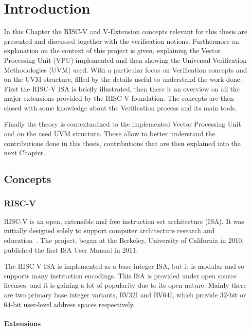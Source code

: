 \chapter{Introduction}
In this Chapter the RISC-V and V-Extension concepts relevant for this thesis are presented and discussed together with  the verification notions.
Furthermore an explanation on the context of this project is given,  explaining the Vector Processing Unit (VPU) implemented and then showing the Universal Verification Methodologies (UVM) used.
With a particular focus on Verification concepts and on the UVM structure, filled by the details useful to understand the work done.
First the RISC-V ISA is briefly illustrated, then there is an overview on all the major extensions provided by the RISC-V foundation. The concepts are then closed with some knowledge about the Verification process and its main tools. 

Finally the theory is contextualized to the implemented Vector Processing Unit and on the used UVM structure. Those allow to better understand the contributions done in this thesis, contributions that are then explained into the next Chapter.






\section{Concepts}
\subsection{RISC-V}
RISC-V is an open, extensible and free instruction set architecture (ISA). It was initially designed solely to support computer architecture research and education~\cite{RISC-V-Instruction-Set-Manual}.
The project, began at the Berkeley, University of California in 2010, published the first ISA User Manual in 2011. 

The RISC-V ISA is implemented as a base integer ISA, but it is modular and so supports many instruction encodings.
This ISA is provided under open source licenses, and it is gaining a lot of popularity due to its open nature. 
Mainly there are two primary base integer variants, RV32I and RV64I, which provide 32-bit or 64-bit user-level address spaces respectively.

\subsubsection{Extensions}


